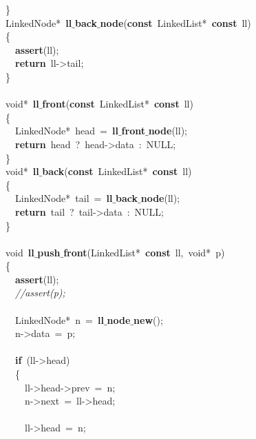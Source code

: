 \documentclass{article}
\begin{document}
\mbox{}\} \\
\mbox{}LinkedNode*\ \textbf{ll$\_$back$\_$node}(\textbf{const}\ LinkedList*\ \textbf{const}\ ll) \\
\mbox{}\{ \\
\mbox{}\ \ \textbf{assert}(ll); \\
\mbox{}\ \ \textbf{return}\ ll-\textgreater{}tail; \\
\mbox{}\} \\
\mbox{} \\
\mbox{}void*\ \textbf{ll$\_$front}(\textbf{const}\ LinkedList*\ \textbf{const}\ ll) \\
\mbox{}\{ \\
\mbox{}\ \ LinkedNode*\ head\ =\ \textbf{ll$\_$front$\_$node}(ll); \\
\mbox{}\ \ \textbf{return}\ head\ ?\ head-\textgreater{}data\ :\ NULL; \\
\mbox{}\} \\
\mbox{}void*\ \textbf{ll$\_$back}(\textbf{const}\ LinkedList*\ \textbf{const}\ ll) \\
\mbox{}\{ \\
\mbox{}\ \ LinkedNode*\ tail\ =\ \textbf{ll$\_$back$\_$node}(ll); \\
\mbox{}\ \ \textbf{return}\ tail\ ?\ tail-\textgreater{}data\ :\ NULL; \\
\mbox{}\} \\
\mbox{} \\
\mbox{}void\ \textbf{ll$\_$push$\_$front}(LinkedList*\ \textbf{const}\ ll,\ void*\ p) \\
\mbox{}\{ \\
\mbox{}\ \ \textbf{assert}(ll); \\
\mbox{}\ \ \textit{//assert(p);} \\
\mbox{} \\
\mbox{}\ \ LinkedNode*\ n\ =\ \textbf{ll$\_$node$\_$new}(); \\
\mbox{}\ \ n-\textgreater{}data\ =\ p; \\
\mbox{} \\
\mbox{}\ \ \textbf{if}\ (ll-\textgreater{}head) \\
\mbox{}\ \ \{ \\
\mbox{}\ \ \ \ ll-\textgreater{}head-\textgreater{}prev\ =\ n; \\
\mbox{}\ \ \ \ n-\textgreater{}next\ =\ ll-\textgreater{}head; \\
\mbox{} \\
\mbox{}\ \ \ \ ll-\textgreater{}head\ =\ n; \\
\end{document}
